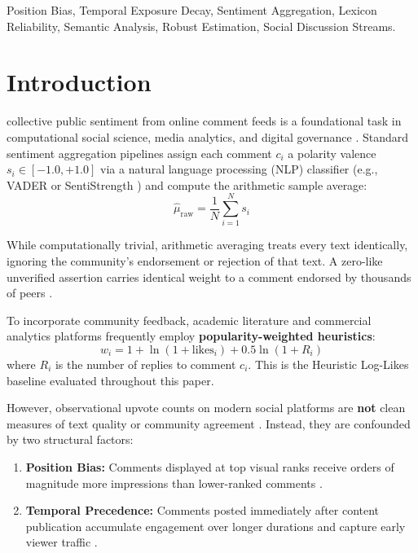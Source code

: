 \documentclass[journal]{IEEEtran}
\begin{document}
\begin{IEEEkeywords}
Position Bias, Temporal Exposure Decay, Sentiment Aggregation, Lexicon Reliability, Semantic Analysis, Robust Estimation, Social Discussion Streams.
\end{IEEEkeywords}

\section{Introduction}
 collective public sentiment from online comment feeds is a foundational task in computational social science, media analytics, and digital governance \cite{thelwall2018social, severyn2016multilingual}. Standard sentiment aggregation pipelines assign each comment $c_i$ a polarity valence $s_i \in [-1.0, +1.0]$ via a natural language processing (NLP) classifier (e.g., VADER \cite{hutto2014vader} or SentiStrength \cite{thelwall2010sentiment}) and compute the arithmetic sample average:
\begin{equation}
\hat{\mu}_{\text{raw}} = \frac{1}{N} \sum_{i=1}^N s_i
\end{equation}

While computationally trivial, arithmetic averaging treats every text identically, ignoring the community's endorsement or rejection of that text. A zero-like unverified assertion carries identical weight to a comment endorsed by thousands of peers \cite{severyn2016multilingual}.

To incorporate community feedback, academic literature and commercial analytics platforms frequently employ \textbf{popularity-weighted heuristics}:
\begin{equation}
w_i = 1 + \ln(1 + \text{likes}_i) + 0.5 \ln(1 + R_i)
\end{equation}
where $R_i$ is the number of replies to comment $c_i$. This is the Heuristic Log-Likes baseline evaluated throughout this paper.

However, observational upvote counts on modern social platforms are \textbf{not} clean measures of text quality or community agreement \cite{muchnik2013social, salganik2006experimental}. Instead, they are confounded by two structural factors:
\begin{enumerate}
    \item \textbf{Position Bias:} Comments displayed at top visual ranks receive orders of magnitude more impressions than lower-ranked comments \cite{joachims2017unbiased, wang2018position, craswell2008experimental}.
    \item \textbf{Temporal Precedence:} Comments posted immediately after content publication accumulate engagement over longer durations and capture early viewer traffic \cite{tsagkias2009predicting, wu2018beyond, borghol2012untold}.
\end{enumerate}
\end{document}

